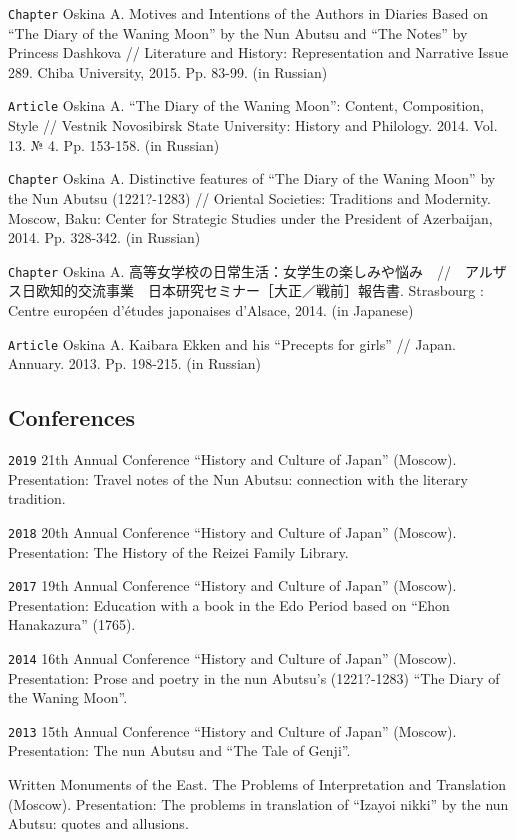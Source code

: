 \documentclass[]{article}
\begin{document}
\texttt{Chapter} Oskina A. Motives and Intentions of the Authors in
Diaries Based on ``The Diary of the Waning Moon'' by the Nun Abutsu and
``The Notes'' by Princess Dashkova // Literature and History:
Representation and Narrative Issue 289. Chiba University, 2015. Pp.
83-99. (in Russian)

\texttt{Article} Oskina A. ``The Diary of the Waning Moon'': Content,
Composition, Style // Vestnik Novosibirsk State University: History and
Philology. 2014. Vol. 13. № 4. Pp. 153-158. (in Russian)

\texttt{Chapter} Oskina A. Distinctive features of ``The Diary of the
Waning Moon'' by the Nun Abutsu (1221?-1283) // Oriental Societies:
Traditions and Modernity. Moscow, Baku: Center for Strategic Studies
under the President of Azerbaijan, 2014. Pp. 328-342. (in Russian)

\texttt{Chapter} Oskina A.
高等女学校の日常生活：女学生の楽しみや悩み　//　アルザス日欧知的交流事業　日本研究セミナー［大正／戦前］報告書.
Strasbourg : Centre européen d'études japonaises d'Alsace, 2014. (in
Japanese)

\texttt{Article} Oskina A. Kaibara Ekken and his ``Precepts for girls''
// Japan. Annuary. 2013. Pp. 198-215. (in Russian)

\hypertarget{conferences}{%
\subsection{Conferences}\label{conferences}}

\texttt{2019} 21th Annual Conference ``History and Culture of Japan''
(Moscow). Presentation: Travel notes of the Nun Abutsu: connection with
the literary tradition.

\texttt{2018} 20th Annual Conference ``History and Culture of Japan''
(Moscow). Presentation: The History of the Reizei Family Library.

\texttt{2017} 19th Annual Conference ``History and Culture of Japan''
(Moscow). Presentation: Education with a book in the Edo Period based on
``Ehon Hanakazura'' (1765).

\texttt{2014} 16th Annual Conference ``History and Culture of Japan''
(Moscow). Presentation: Prose and poetry in the nun Abutsu's
(1221?-1283) ``The Diary of the Waning Moon''.

\texttt{2013} 15th Annual Conference ``History and Culture of Japan''
(Moscow). Presentation: The nun Abutsu and ``The Tale of Genji''.

Written Monuments of the East. The Problems of Interpretation and
Translation (Moscow). Presentation: The problems in translation of
``Izayoi nikki'' by the nun Abutsu: quotes and allusions.
\end{document}
